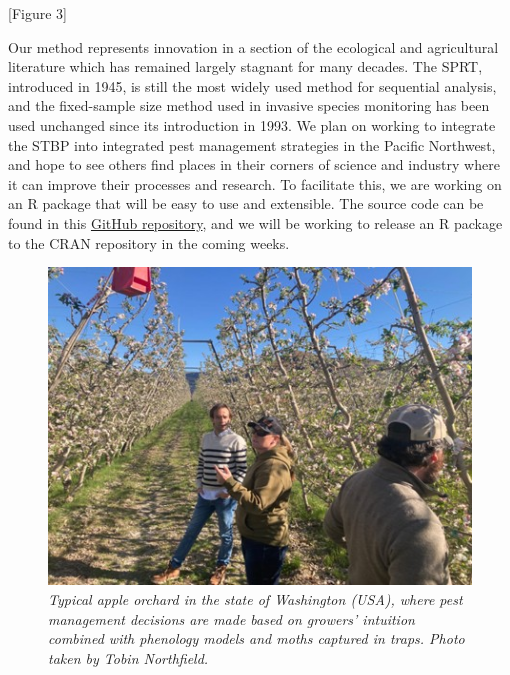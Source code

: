 \documentclass[
]{article}
\begin{document}
{[}Figure 3{]}

Our method represents innovation in a section of the ecological and
agricultural literature which has remained largely stagnant for many
decades. The SPRT, introduced in 1945, is still the most widely used
method for sequential analysis, and the fixed-sample size method used in
invasive species monitoring has been used unchanged since its
introduction in 1993. We plan on working to integrate the STBP into
integrated pest management strategies in the Pacific Northwest, and hope
to see others find places in their corners of science and industry where
it can improve their processes and research. To facilitate this, we are
working on an R package that will be easy to use and extensible. The
source code can be found in this
\href{https://github.com/rincondf/STBP}{GitHub repository}, and we will
be working to release an R package to the CRAN repository in the coming
weeks.

\begin{figure}
\centering
\includegraphics{Figures/Fig1Post.jpg}
\caption{\emph{Typical apple orchard in the state of Washington (USA),
where pest management decisions are made based on growers' intuition
combined with phenology models and moths captured in traps. Photo taken
by Tobin Northfield.}}
\end{figure}
\end{document}

